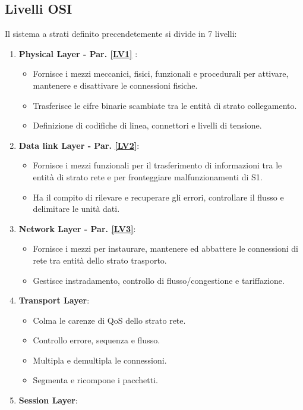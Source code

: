\documentclass[12pt]{article}
\begin{document}
\subsection{Livelli OSI}
Il sistema a strati definito precendetemente si divide in 7 livelli:
\begin{enumerate}
  \item \textbf{Physical Layer - Par. \ref{LV1}} :
  \begin{itemize}
    \item Fornisce i mezzi meccanici, fisici, funzionali e procedurali per attivare, mantenere e disattivare le connessioni fisiche.
    \item Trasferisce le cifre binarie scambiate tra le entità di strato collegamento.
    \item Definizione di codifiche di linea, connettori e livelli di tensione.
  \end{itemize}
  \item \textbf{Data link Layer - Par. \ref{LV2}}:
  \begin{itemize}
    \item Fornisce i mezzi funzionali per il trasferimento di informazioni tra le entità di strato rete e per fronteggiare malfunzionamenti di S1.
    \item Ha il compito di rilevare e recuperare gli errori, controllare il flusso e delimitare le unità dati.
  \end{itemize}
  \item \textbf{Network Layer - Par. \ref{LV3}}:
    \begin{itemize}
      \item Fornisce i mezzi per instaurare, mantenere ed abbattere le connessioni di rete tra entità dello strato trasporto.
      \item Gestisce instradamento, controllo di flusso/congestione e tariffazione.
    \end{itemize}
  \item \textbf{Transport Layer}:
    \begin{itemize}
      \item Colma le carenze di QoS dello strato rete.
      \item Controllo errore, sequenza e flusso.
      \item Multipla e demultipla le connessioni.
      \item Segmenta e ricompone i pacchetti.
    \end{itemize}
  \item \textbf{Session Layer}:

\end{enumerate}
\end{document}
